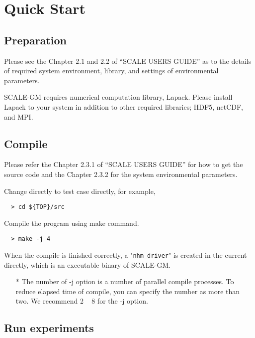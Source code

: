 \section{Quick Start}

\subsection{Preparation}

Please see the Chapter 2.1 and 2.2 of ``SCALE USERS GUIDE'' 
as to the details of required system environment, library, and settings of environmental parameters.

SCALE-GM requires numerical computation library, Lapack.
Please install Lapack to your system in addition to other required libraries; HDF5, netCDF, and MPI.


\subsection{Compile}
Please refer the Chapter 2.3.1 of ``SCALE USERS GUIDE'' for how to get the source code
and the Chapter 2.3.2 for the system environmental parameters.

Change directly to test case directly, for example,
\begin{verbatim}
  > cd ${TOP}/src
\end{verbatim}

\noindent Compile the program using make command.
\begin{verbatim}
  > make -j 4
\end{verbatim}
When the compile is finished correctly, a "\verb|nhm_driver|" is created
in the current directly, which is an executable binary of SCALE-GM.

\begin{itemize}
  \item[*] The number of -j option is a number of parallel compile processes.
   To reduce elapsed time of compile, you can specify the number
   as more than two. We recommend 2 ~ 8 for the -j option.
\end{itemize}

\subsection{Run experiments}
